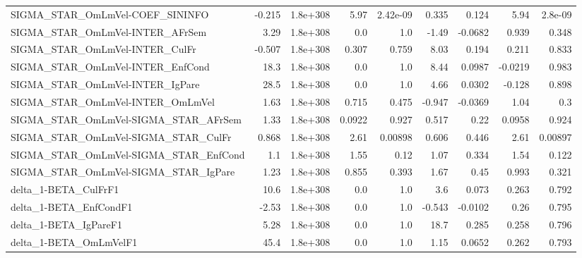 \begin{tabular}{lrrrrrrrr}
SIGMA\_STAR\_OmLmVel-COEF\_SININFO       &      -0.215 &     1.8e+308 &     5.97 & 2.42e-09 &      0.335 &       0.124 &         5.94 &       2.8e-09 \\
SIGMA\_STAR\_OmLmVel-INTER\_AFrSem       &        3.29 &     1.8e+308 &      0.0 &      1.0 &      -1.49 &     -0.0682 &        0.939 &         0.348 \\
SIGMA\_STAR\_OmLmVel-INTER\_CulFr        &      -0.507 &     1.8e+308 &    0.307 &    0.759 &       8.03 &       0.194 &        0.211 &         0.833 \\
SIGMA\_STAR\_OmLmVel-INTER\_EnfCond      &        18.3 &     1.8e+308 &      0.0 &      1.0 &       8.44 &      0.0987 &      -0.0219 &         0.983 \\
SIGMA\_STAR\_OmLmVel-INTER\_IgPare       &        28.5 &     1.8e+308 &      0.0 &      1.0 &       4.66 &      0.0302 &       -0.128 &         0.898 \\
SIGMA\_STAR\_OmLmVel-INTER\_OmLmVel      &        1.63 &     1.8e+308 &    0.715 &    0.475 &     -0.947 &     -0.0369 &         1.04 &           0.3 \\
SIGMA\_STAR\_OmLmVel-SIGMA\_STAR\_AFrSem  &        1.33 &     1.8e+308 &   0.0922 &    0.927 &      0.517 &        0.22 &       0.0958 &         0.924 \\
SIGMA\_STAR\_OmLmVel-SIGMA\_STAR\_CulFr   &       0.868 &     1.8e+308 &     2.61 &  0.00898 &      0.606 &       0.446 &         2.61 &       0.00897 \\
SIGMA\_STAR\_OmLmVel-SIGMA\_STAR\_EnfCond &         1.1 &     1.8e+308 &     1.55 &     0.12 &       1.07 &       0.334 &         1.54 &         0.122 \\
SIGMA\_STAR\_OmLmVel-SIGMA\_STAR\_IgPare  &        1.23 &     1.8e+308 &    0.855 &    0.393 &       1.67 &        0.45 &        0.993 &         0.321 \\
delta\_1-BETA\_CulFrF1                  &        10.6 &     1.8e+308 &      0.0 &      1.0 &        3.6 &       0.073 &        0.263 &         0.792 \\
delta\_1-BETA\_EnfCondF1                &       -2.53 &     1.8e+308 &      0.0 &      1.0 &     -0.543 &     -0.0102 &         0.26 &         0.795 \\
delta\_1-BETA\_IgPareF1                 &        5.28 &     1.8e+308 &      0.0 &      1.0 &       18.7 &       0.285 &        0.258 &         0.796 \\
delta\_1-BETA\_OmLmVelF1                &        45.4 &     1.8e+308 &      0.0 &      1.0 &       1.15 &      0.0652 &        0.262 &         0.793 \\

\end{tabular}
